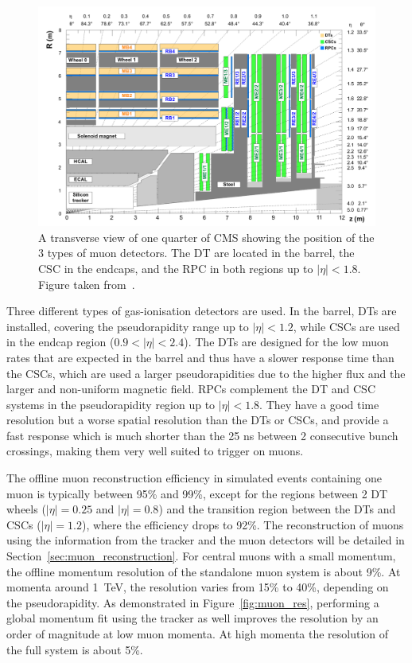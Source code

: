 \begin{figure}[ht]
  \centering
 \includegraphics[width=.9\textwidth]{muon_system_new}
 \caption{A transverse view of one quarter of \ac{CMS} showing the position of the 3 types of muon detectors. The \protect\acf{DT} are located in the barrel, the \protect\acf{CSC} in the endcaps, and the \protect\acf{RPC} in both regions up to $|\eta| < 1.8$. Figure taken from~\cite{Abbiendi:2015txa}.}
 \label{fig:muons}
\end{figure}

Three different types of gas-ionisation detectors are used. In the barrel, \acp{DT} are installed, covering the pseudorapidity range up to $|\eta| < 1.2$, while \acp{CSC} are used in the endcap region ($0.9 < |\eta| < 2.4$). The \acp{DT} are designed for the low muon rates that are expected in the barrel and thus have a slower response time than the \acp{CSC}, which are used a larger pseudorapidities due to the higher flux and the larger and non-uniform magnetic field. \acp{RPC} complement the \ac{DT} and \ac{CSC} systems in the pseudorapidity region up to $|\eta| < 1.8$. They have a good time resolution but a worse spatial resolution than the \acp{DT} or \acp{CSC}, and provide a fast response which is much shorter than the 25 ns between 2 consecutive bunch crossings, making them very well suited to trigger on muons.

The offline muon reconstruction efficiency in simulated events containing one muon is typically between 95\% and 99\%, except for the regions between 2 \ac{DT} wheels ($|\eta| = 0.25$ and $|\eta| = 0.8$) and the transition region between the \acp{DT} and \acp{CSC} ($|\eta| = 1.2$), where the efficiency drops to 92\%. The reconstruction of muons using the information from the tracker and the muon detectors will be detailed in Section~\ref{sec:muon_reconstruction}. For central muons with a small momentum, the offline momentum resolution of the standalone muon system is about 9\%. At momenta around \SI{1}{TeV}, the resolution varies from 15\% to 40\%, depending on the pseudorapidity. As demonstrated in Figure~\ref{fig:muon_res}, performing a global momentum fit using the tracker as well improves the resolution by an order of magnitude at low muon momenta. At high momenta the resolution of the full system is about 5\%.

